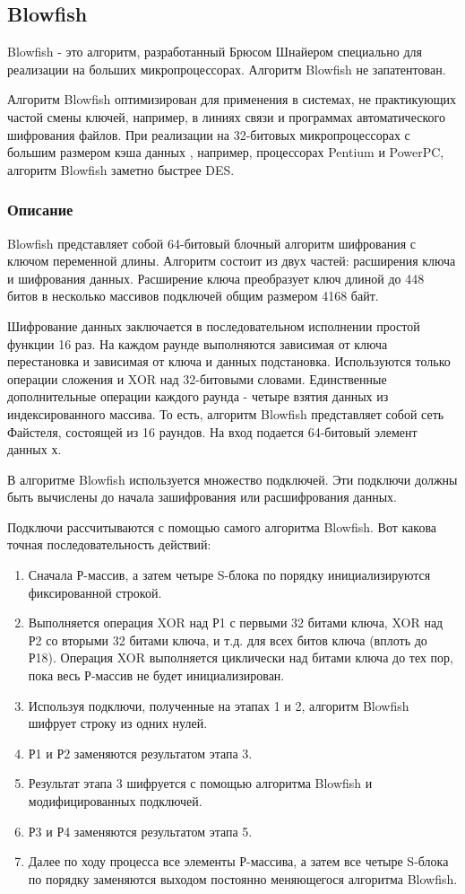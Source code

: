 \subsection{Blowfish}
Blowfish - это алгоритм, разработанный Брюсом Шнайером специально 
для реализации на больших микропроцессорах. Алгоритм Blowfish 
не запатентован.

Алгоритм Blowfish оптимизирован для применения в системах, не 
практикующих частой смены ключей, например, в линиях связи и 
программах автоматического шифрования файлов. При реализации 
на 32-битовых микропроцессорах с большим размером кэша данных
, например, процессорах Pentium и PowerPC, алгоритм Blowfish 
заметно быстрее DES.

\subsubsection{Описание}

Blowfish представляет собой 64-битовый блочный алгоритм шифрования 
с ключом переменной длины. Алгоритм состоит из двух частей: расширения 
ключа и шифрования данных. Расширение ключа преобразует ключ 
длиной до 448 битов в несколько массивов подключей общим размером 4168 байт.

Шифрование данных заключается в последовательном исполнении простой 
функции 16 раз. На каждом раунде выполняются зависимая от ключа 
перестановка и зависимая от ключа и данных подстановка. Используются 
только операции сложения и XOR над 32-битовыми словами. Единственные 
дополнительные операции каждого раунда - четыре взятия данных 
из индексированного массива.
То есть, алгоритм Blowfish представляет собой сеть Файстеля, состоящей 
из 16 раундов. На вход подается 64-битовый элемент данных х.

В алгоритме Blowfish используется множество подключей. Эти подключи 
должны быть вычислены до начала зашифрования или расшифрования данных.

Подключи рассчитываются с помощью самого алгоритма Blowfish. 
Вот какова точная последовательность действий:
\begin{enumerate}
\item Сначала Р-массив, а затем четыре S-блока по порядку инициализируются 
    фиксированной строкой.
\item Выполняется операция XOR над Р1 с первыми 32 битами ключа, 
    XOR над Р2 со вторыми 32 битами ключа, и т.д. для всех битов 
    ключа (вплоть до Р18). Операция XOR выполняется циклически над 
    битами ключа до тех пор, пока весь Р-массив не будет инициализирован.
\item Используя подключи, полученные на этапах 1 и 2, алгоритм 
    Blowfish шифрует строку из одних нулей.
\item Р1 и Р2 заменяются результатом этапа 3.
\item Результат этапа 3 шифруется с помощью алгоритма Blowfish 
    и модифицированных подключей.
\item Р3 и Р4 заменяются результатом этапа 5.
\item Далее по ходу процесса все элементы Р-массива, а затем 
    все четыре S-блока по порядку заменяются выходом постоянно меняющегося 
    алгоритма Blowfish.
\end{enumerate}

